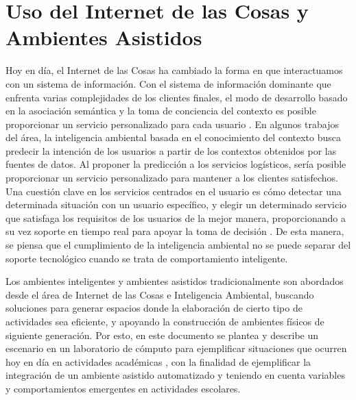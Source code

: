 \section{Uso del Internet de las Cosas y Ambientes Asistidos}
Hoy en día, el Internet de las Cosas ha cambiado la forma en que interactuamos con un sistema de información. Con el sistema de información dominante que enfrenta varias complejidades de los clientes finales, el modo de desarrollo basado en la asociación semántica y la toma de conciencia del contexto es posible proporcionar un servicio personalizado para cada usuario \citep{Liu2018, Virtanen2017}. En algunos trabajos del área, la inteligencia ambiental basada en el conocimiento del contexto busca predecir la intención de los usuarios a partir de los contextos obtenidos por las fuentes de datos. Al proponer la predicción a los servicios logísticos, sería posible proporcionar un servicio personalizado para mantener a los clientes satisfechos. Una cuestión clave en los servicios centrados en el usuario es cómo detectar una determinada situación con un usuario específico, y elegir un determinado servicio que satisfaga los requisitos de los usuarios de la mejor manera, proporcionando a su vez soporte en tiempo real para apoyar la toma de decisión \citep{Sezer2017}. De esta manera, se piensa que el cumplimiento de la inteligencia ambiental no se puede separar del soporte tecnológico cuando se trata de comportamiento inteligente.

Los ambientes inteligentes y ambientes asistidos tradicionalmente son abordados desde el área de Internet de las Cosas e Inteligencia Ambiental, buscando soluciones para generar espacios donde la elaboración de cierto tipo de actividades sea eficiente, y apoyando la construcción de ambientes físicos de siguiente generación. Por esto, en este documento se plantea y describe un escenario en un laboratorio de cómputo para ejemplificar situaciones que ocurren hoy en día en actividades académicas \citep{Virtanen2017}, con la finalidad de ejemplificar la integración de un ambiente asistido automatizado y teniendo en cuenta variables y comportamientos emergentes en actividades escolares.

